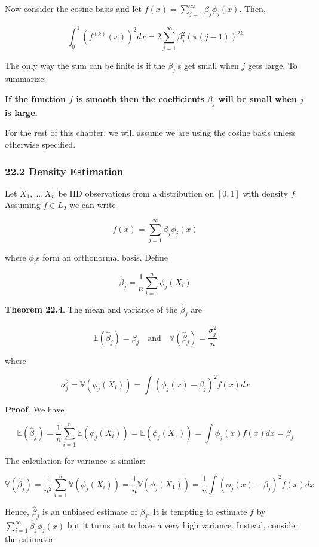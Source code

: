 Now consider the cosine basis and let
\(f(x) = \sum_{j=1}^\infty \beta_j \phi_j(x)\). Then,

\[ \int_0^1 (f^{(k)}(x))^2 dx = 2 \sum_{j=1}^\infty \beta_j^2 ( \pi (j - 1) ) ^{2k} \]

The only way the sum can be finite is if the \(\beta_j\)'s get small
when \(j\) gets large. To summarize:

\textbf{If the function \(f\) is smooth then the coefficients
\(\beta_j\) will be small when \(j\) is large.}

For the rest of this chapter, we will assume we are using the cosine
basis unless otherwise specified.

\subsubsection{22.2 Density Estimation}\label{density-estimation}

Let \(X_1, \dots, X_n\) be IID observations from a distribution on
\([0, 1]\) with density \(f\). Assuming \(f \in L_2\) we can write

\[ f(x) = \sum_{j=1}^\infty \beta_j \phi_j(x) \]

where \(\phi_i\)s form an orthonormal basis. Define

\[ \hat{\beta}_j = \frac{1}{n} \sum_{i=1}^n \phi_j(X_i)\]

\textbf{Theorem 22.4}. The mean and variance of the \(\hat{\beta}_j\)
are

\[
\mathbb{E}(\hat{\beta}_j) = \beta_j
\quad \text{and} \quad
\mathbb{V}(\hat{\beta}_j) = \frac{\sigma_j^2}{n}
\]

where

\[ \sigma_j^2 = \mathbb{V}(\phi_j(X_i)) = \int \left( \phi_j(x) - \beta_j\right)^2f(x) dx\]

\textbf{Proof}. We have

\[ \mathbb{E}(\hat{\beta}_j) = \frac{1}{n} \sum_{i=1}^n \mathbb{E}(\phi_j(X_i)) = \mathbb{E}(\phi_j(X_1))  = \int \phi_j(x) f(x) dx = \beta_j\]

The calculation for variance is similar:

\[ \mathbb{V}(\hat{\beta}_j) = \frac{1}{n^2} \sum_{i=1}^n \mathbb{V}(\phi_j(X_i)) = \frac{1}{n} \mathbb{V}(\phi_j(X_1)) = \frac{1}{n} \int \left( \phi_j(x) - \beta_j\right)^2f(x) dx \]

Hence, \(\hat{\beta}_j\) is an unbiased estimate of \(\beta_j\). It is
tempting to estimate \(f\) by
\(\sum_{i=1}^\infty \hat{\beta}_j \phi_j(x)\) but it turns out to have a
very high variance. Instead, consider the estimator

